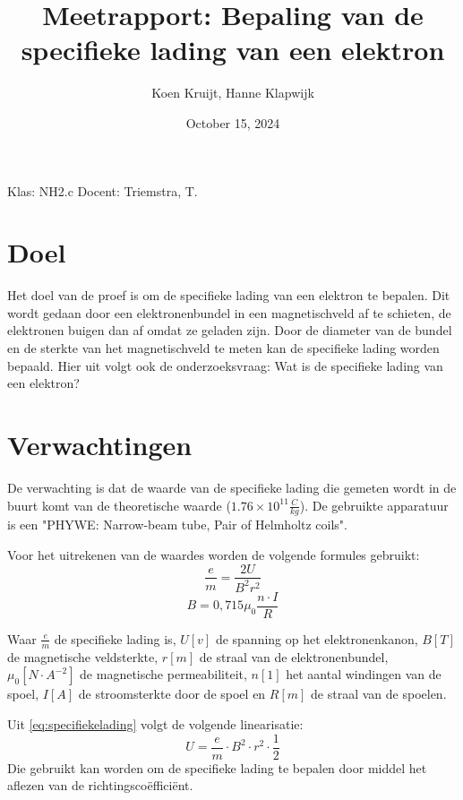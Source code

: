 \documentclass{article}
\title{Meetrapport: Bepaling van de specifieke lading van een elektron}
\author{Koen Kruijt, Hanne Klapwijk}
\date{October 15, 2024}
\begin{document}
\maketitle

Klas: NH2.c \newline
Docent: Triemstra, T.

\newpage
\tableofcontents
\newpage
\section{Doel}
Het doel van de proef is om de specifieke lading van een elektron te bepalen. Dit wordt gedaan door een elektronenbundel in een magnetischveld af te schieten, de elektronen buigen dan af omdat ze geladen zijn. Door de diameter van de bundel en de sterkte van het magnetischveld te meten kan de specifieke lading worden bepaald.
Hier uit volgt ook de onderzoeksvraag: Wat is de specifieke lading van een elektron?

\section{Verwachtingen}
De verwachting is dat de waarde van de specifieke lading die gemeten wordt in de buurt komt van de theoretische waarde ($1.76 \times 10^{11} \frac{C}{kg}$\cite{masscharge}). De gebruikte apparatuur is een "PHYWE: Narrow-beam tube, Pair of Helmholtz coils".

Voor het uitrekenen van de waardes worden de volgende formules gebruikt:
\begin{equation}
	\frac{e}{m} = \frac{2U}{B^2r^2}
	\label{eq:specifiekelading}
\end{equation}
\begin{equation}
	B = 0,715\mu_0 \frac{n \cdot I}{R}
	\label{eq:magnetischveld}
\end{equation}

Waar $\frac{e}{m}$ de specifieke lading is, $U [v]$ de spanning op het elektronenkanon, $B [T]$ de magnetische veldsterkte, $r [m]$ de straal van de elektronenbundel, $\mu_0 [N\cdot A^{-2}]$ de magnetische permeabiliteit, $n [1]$ het aantal windingen van de spoel, $I [A]$ de stroomsterkte door de spoel en $R [m]$ de straal van de spoelen.

Uit \ref{eq:specifiekelading} volgt de volgende linearisatie:
\begin{equation}
	U =\frac{e}{m} \cdot B^2 \cdot r^2 \cdot \frac{1}{2}
	\label{eq:linearisatie}
\end{equation}
Die gebruikt kan worden om de specifieke lading te bepalen door middel het aflezen van de richtingscoëfficiënt.
\end{document}
